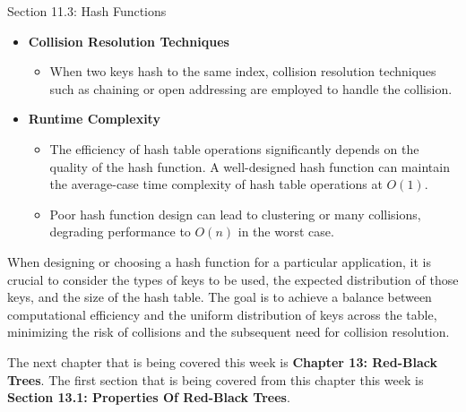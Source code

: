 \begin{notes}{Section 11.3: Hash Functions}
\begin{itemize}
        \item \textbf{Collision Resolution Techniques}
        \begin{itemize}
            \item When two keys hash to the same index, collision resolution techniques such as chaining or open addressing are employed to handle the collision.
        \end{itemize}
        
        \item \textbf{Runtime Complexity}
        \begin{itemize}
            \item The efficiency of hash table operations significantly depends on the quality of the hash function. A well-designed hash function can maintain the average-case time complexity of hash 
            table operations at $O(1)$.
            \item Poor hash function design can lead to clustering or many collisions, degrading performance to $O(n)$ in the worst case.
        \end{itemize}
    \end{itemize}
    
    \begin{highlight}
        When designing or choosing a hash function for a particular application, it is crucial to consider the types of keys to be used, the expected distribution of those keys, and the size of the 
        hash table. The goal is to achieve a balance between computational efficiency and the uniform distribution of keys across the table, minimizing the risk of collisions and the subsequent need 
        for collision resolution.
    \end{highlight}    
\end{notes}

The next chapter that is being covered this week is \textbf{Chapter 13: Red-Black Trees}. The first section that is being covered from this chapter this week is \textbf{Section 13.1: Properties Of Red-Black Trees}.

